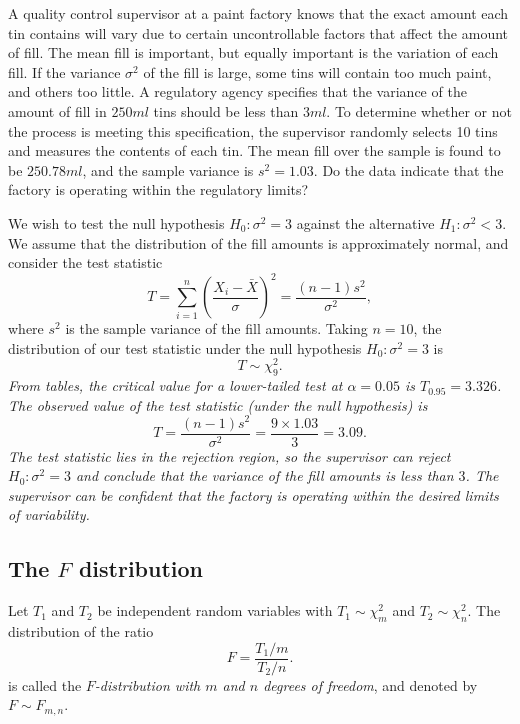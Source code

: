 \begin{example}
A quality control supervisor at a paint factory knows that the exact amount each tin contains will vary due to certain uncontrollable factors that affect the amount of fill. The mean fill is important, but equally important is the variation of each fill. If the variance $\sigma^2$ of the fill is large, some tins will contain too much paint, and others too little. A regulatory agency specifies that the variance of the amount of fill in $250ml$ tins should be less than $3ml$. To determine whether or not the process is meeting this specification, the supervisor randomly selects 10 tins and measures the contents of each tin. The mean fill over the sample is found to be $250.78ml$, and the sample variance is $s^2 = 1.03$. Do the data indicate that the factory is operating within the regulatory limits?
\begin{solution}
We wish to test the null hypothesis $H_0:\sigma^2 = 3$ against the alternative $H_1:\sigma^2 < 3$. We assume that the distribution of the fill amounts is approximately normal, and consider the test statistic 
\[
T = \sum_{i=1}^{n} \left(\frac{X_i-\bar{X}}{\sigma}\right)^2 = \frac{(n-1)s^2}{\sigma^2},
\]
where $s^2$ is the sample variance of the fill amounts. Taking $n=10$, the distribution of our test statistic under the null hypothesis $H_0:\sigma^2 = 3$ is
\[
T \sim \chi^2_9.
\]
\bit
\it From tables, the critical value for a lower-tailed test at $\alpha=0.05$ is $T_{0.95} = 3.326$.
\it The observed value of the test statistic (under the null hypothesis) is
\[
T = \frac{(n-1)s^2}{\sigma^2} = \frac{9\times 1.03}{3} = 3.09.
\]
\eit 
The test statistic lies in the rejection region, so the supervisor can reject $H_0:\sigma^2=3$ and conclude that the variance of the fill amounts is less than $3$. The supervisor can be confident that the factory is operating within the desired limits of variability. 
\end{solution}
\end{example}

\subsection{The $F$ distribution}
\begin{definition}
Let $T_1$ and $T_2$ be independent random variables with $T_1\sim\chi^2_m$ and $T_2\sim\chi^2_n$. The distribution of the ratio
\[
F = \frac{T_1/m}{T_2/n}.
\]
is called the \emph{$F$-distribution with $m$ and $n$ degrees of freedom}, and denoted by $F\sim F_{m,n}$.
\end{definition}

